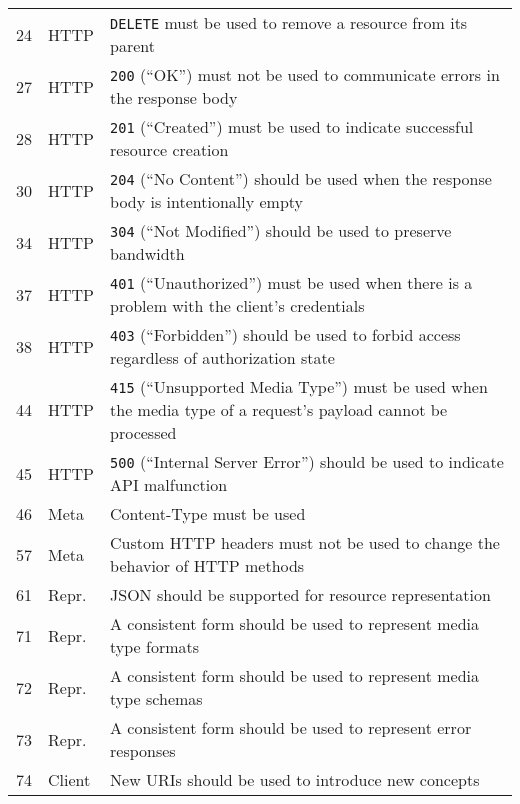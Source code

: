 \documentclass[runningheads]{llncs}
\begin{document}
\begin{table}
\begin{tabular}{p{}>{\raggedright}p{}>{\raggedright\arraybackslash}p{}}
24 & HTTP      & \texttt{DELETE} must be used to remove a resource from its parent                                                   \\
27 & HTTP      & \texttt{200} (\enquote{OK}) must not be used to communicate errors in the response body                                     \\
28 & HTTP      & \texttt{201} (\enquote{Created}) must be used to indicate successful resource creation                                      \\
30 & HTTP      & \texttt{204} (\enquote{No Content}) should be used when the response body is intentionally empty                            \\
34 & HTTP      & \texttt{304} (\enquote{Not Modified}) should be used to preserve bandwidth                                                  \\
37 & HTTP      & \texttt{401} (\enquote{Unauthorized}) must be used when there is a problem with the client’s credentials                    \\
38 & HTTP      & \texttt{403} (\enquote{Forbidden}) should be used to forbid access regardless of authorization state                        \\
44 & HTTP      & \texttt{415} (\enquote{Unsupported Media Type}) must be used when the media type of a request’s payload cannot be processed \\
45 & HTTP      & \texttt{500} (\enquote{Internal Server Error}) should be used to indicate API malfunction                                   \\
46 & Meta      & Content-Type must be used                                                                                  \\
57 & Meta      & Custom HTTP headers must not be used to change the behavior of HTTP methods                                \\
61 & Repr.     & JSON should be supported for resource representation                                                       \\
71 & Repr.     & A consistent form should be used to represent media type formats                                           \\
72 & Repr.     & A consistent form should be used to represent media type schemas                                           \\
73 & Repr.     & A consistent form should be used to represent error responses                                              \\
74 & Client    & New URIs should be used to introduce new concepts \\
\hline
	\end{tabular}
\end{table}
\end{document}

